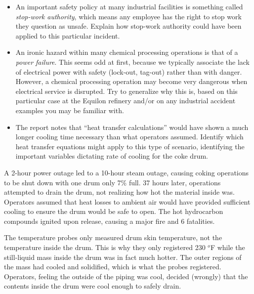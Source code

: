 \begin{itemize}
\item{} An important safety policy at many industrial facilities is something called {\it stop-work authority}, which means any employee has the right to stop work they question as unsafe.  Explain how stop-work authority could have been applied to this particular incident.
\item{} An ironic hazard within many chemical processing operations is that of a {\it power failure}.  This seems odd at first, because we typically associate the lack of electrical power with safety (lock-out, tag-out) rather than with danger.  However, a chemical processing operation may become very dangerous when electrical service is disrupted.  Try to generalize why this is, based on this particular case at the Equilon refinery and/or on any industrial accident examples you may be familiar with.
\item{} The report notes that ``heat transfer calculations'' would have shown a much longer cooling time necessary than what operators assumed.  Identify which heat transfer equations might apply to this type of scenario, identifying the important variables dictating rate of cooling for the coke drum.
\end{itemize}














A 2-hour power outage led to a 10-hour steam outage, causing coking operations to be shut down with one drum only 7\% full.  37 hours later, operations attempted to drain the drum, not realizing how hot the material inside was.  Operators assumed that heat losses to ambient air would have provided sufficient cooling to ensure the drum would be safe to open.  The hot hydrocarbon compounds ignited upon release, causing a major fire and 6 fatalities.

\vskip 10pt

The temperature probes only measured drum skin temperature, not the temperature inside the drum.  This is why they only registered 230 $^{o}$F while the still-liquid mass inside the drum was in fact much hotter.  The outer regions of the mass had cooled and solidified, which is what the probes registered.  Operators, feeling the outside of the piping was cool, decided (wrongly) that the contents inside the drum were cool enough to safely drain.

